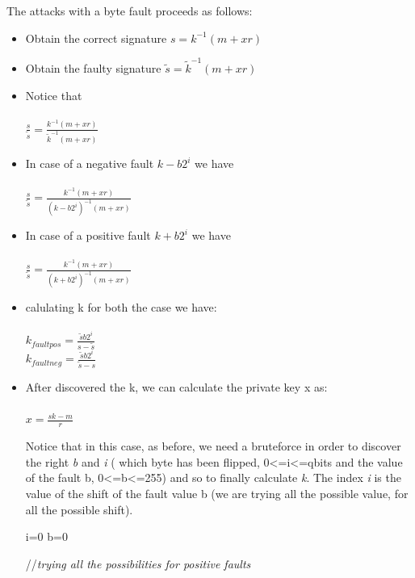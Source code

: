 \documentclass[11pt,english]{article}
\begin{document}
The attacks with a byte fault proceeds as follows: 
\begin{itemize}
\item Obtain the correct signature $s = k^{-1}(m + xr) $
\item Obtain the faulty signature $\tilde{s} = \tilde{k}^{-1}(m + xr)$
\item Notice that \\\\$\frac{s}{\tilde{s}}  = \frac{k^{-1}(m+xr)}{\tilde{k}^{-1}(m+xr)}$

\item In case of a negative fault $k-b2^{i} $ we have\\\\ $\frac{s}{\tilde{s}} = \frac{k^{-1}(m+xr)}{(k-b2^{i})^{-1}(m+xr)}$

\item In case of a positive fault $k+b2^{i} $ we have \\\\$\frac{s}{\tilde{s}} = \frac{k^{-1}(m+xr)}{(k+b2^{i})^{-1}(m+xr)}$


\item calulating k for both the case we have: \\\\$k_{faultpos} = \frac{\tilde{s}b2^{i}}{s-\tilde{s}}$ \\
$k_{faultneg} = \frac{\tilde{s}b2^{i}}{\tilde{s}-s}$ \\

\item After discovered the k, we can calculate the private key x as:\\\\ $x = \frac{sk - m}{r}$

Notice that in this case, as before, we need a bruteforce in order to discover the right \textit{b} and \textit{i} ( which byte has been flipped, 0<=i<=qbits and the value of the fault b, 0<=b<=255) and so to finally calculate \textit{k}. The index \textit{i} is the value of the shift of the fault value b (we are trying all the possible value, for all the possible shift).

\begin{algorithm}[H]
  
  
  i=0\;
  b=0\;
  
  //\textit{trying all the possibilities for positive faults}\;


\end{algorithm}
\end{itemize}
\end{document}
